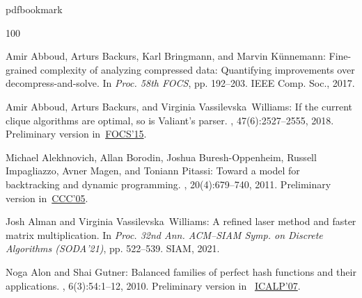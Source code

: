 \newcommand{\prelim}{Preliminary version in\ }\newcommand{\prelims}{Preliminary
  versions in\ }
\providecommand{\bibhead}[1]{}
\expandafter\ifx\csname pdfbookmark\endcsname\relax%
  \providecommand{\tocrefpdfbookmark}{}
\else\providecommand{\tocrefpdfbookmark}{%
   \hypertarget{tocreferences}{}%
   \pdfbookmark[1]{References}{tocreferences}}%
\fi

\tocrefpdfbookmark
\begin{thebibliography}{100}

\bibhead{AbboudBBK2017}
{\sc Amir Abboud, Arturs Backurs, Karl Bringmann, and Marvin K{\"{u}}nnemann}:
  Fine-grained complexity of analyzing compressed data: Quantifying
  improvements over decompress-and-solve.
\newblock In {\em Proc. 58th FOCS}, pp. 192--203. IEEE Comp. Soc., 2017.

\bibhead{AbboudBW15a}
{\sc Amir Abboud, Arturs Backurs, and Virginia Vassilevska~Williams}: If the
  current clique algorithms are optimal, so is {V}aliant's parser.
, 47(6):2527--2555, 2018.
\newblock \prelim \href{https://doi.org/10.1109/FOCS.2015.16}{FOCS'15}.

\bibhead{AlekhnovichBBIMP2011}
{\sc Michael Alekhnovich, Allan Borodin, Joshua Buresh{-}Oppenheim, Russell
  Impagliazzo, Avner Magen, and Toniann Pitassi}: Toward a model for
  backtracking and dynamic programming.
, 20(4):679--740, 2011.
\newblock \prelim \href{https://doi.org/10.1109/CCC.2005.32}{CCC'05}.

\bibhead{AlmanVW2021}
{\sc Josh Alman and Virginia Vassilevska~Williams}: A refined laser method and
  faster matrix multiplication.
\newblock In {\em Proc. 32nd Ann. ACM--SIAM Symp. on Discrete Algorithms
  (SODA'21)}, pp. 522--539. SIAM, 2021.

\bibhead{AlonG2010}
{\sc Noga Alon and Shai Gutner}: Balanced families of perfect hash functions
  and their applications.
, 6(3):54:1--12, 2010.
\newblock \prelim
  \href{https://doi.org/10.1007/978-3-540-73420-8\_39}{ICALP'07}.


\end{thebibliography}
